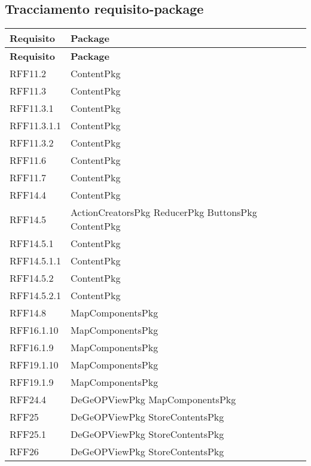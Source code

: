 \newpage

	\subsection{Tracciamento requisito-package}	
	\def\arraystretch{1.5}
	\begin{longtable}{p{2.5cm}!{\VRule[1pt]}p{5cm}}
		\color{white} \textbf{Requisito} & \color{white} \textbf{Package} \\ 
		\endfirsthead
		\color{white} \textbf{Requisito} & \color{white} \textbf{Package} \\ 
		\endhead
		RFF11.2 & ContentPkg\\
		RFF11.3 & ContentPkg\\
		RFF11.3.1 & ContentPkg\\
		RFF11.3.1.1 & ContentPkg\\
		RFF11.3.2 & ContentPkg\\
		RFF11.6 & ContentPkg\\
		RFF11.7 & ContentPkg\\
		RFF14.4 & ContentPkg\\
		RFF14.5 & ActionCreatorsPkg \newline ReducerPkg \newline ButtonsPkg \newline ContentPkg\\
		RFF14.5.1 & ContentPkg\\
		RFF14.5.1.1 & ContentPkg\\
		RFF14.5.2 & ContentPkg\\
		RFF14.5.2.1 & ContentPkg\\
		RFF14.8 & MapComponentsPkg\\
		RFF16.1.10 & MapComponentsPkg\\
		RFF16.1.9 & MapComponentsPkg\\
		RFF19.1.10 & MapComponentsPkg\\
		RFF19.1.9 & MapComponentsPkg\\
		RFF24.4 & DeGeOPViewPkg \newline MapComponentsPkg\\
		RFF25 & DeGeOPViewPkg \newline StoreContentsPkg\\
		RFF25.1 & DeGeOPViewPkg \newline StoreContentsPkg\\
		RFF26 & DeGeOPViewPkg \newline StoreContentsPkg\\

\end{longtable}
